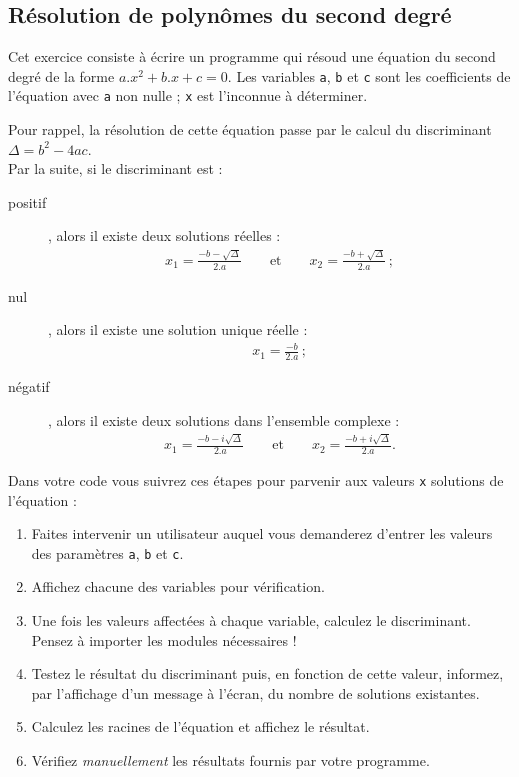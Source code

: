 

\subsection{Résolution de polynômes du second degré}

Cet exercice  consiste à écrire un programme qui résoud une  équation du second degré  de la
forme  $a.x^2+b.x+c =  0$.   Les variables  \texttt{a}, \texttt{b}  et
\texttt{c}  sont  les  coefficients   de  l'équation  avec  \texttt{a}
non nulle ; \texttt{x} est l'inconnue à déterminer.

Pour rappel,  la résolution de cette  équation passe par le  calcul du
discriminant $\Delta =  b^2-4ac$.\\ Par la suite, si  le 
discriminant est :

\begin{description}
\item[positif], alors il existe deux solutions réelles :
\begin{eqnarray*}
  x_1   =  \frac{-b-\sqrt{\Delta}}{2.a}   \qquad  \textrm{et}   \qquad
  x_2=\frac{-b+\sqrt{\Delta}}{2.a}\,;
\end{eqnarray*}
\item[nul], alors il existe une solution unique réelle :
\begin{eqnarray*}
  x_1 = \frac{-b}{2.a}\,;
\end{eqnarray*}
\item[négatif], alors il existe deux solutions dans l'ensemble complexe :
\begin{eqnarray*}
  x_1  =   \frac{-b-i\sqrt{\Delta}}{2.a}  \qquad   \textrm{et}  \qquad
  x_2=\frac{-b+i\sqrt{\Delta}}{2.a}.
\end{eqnarray*}
\end{description}


Dans votre code vous suivrez ces étapes pour parvenir aux valeurs \texttt{x} solutions de l'équation :
\begin{enumerate}

\item Faites intervenir un utilisateur auquel vous demanderez d'entrer
  les valeurs des paramètres \texttt{a}, \texttt{b} et \texttt{c}.
\item Affichez chacune des variables pour vérification.
\item  Une fois  les  valeurs affectées à chaque variable, calculez  le
  discriminant.\\ Pensez à importer les modules nécessaires !
\item  Testez le  résultat du  discriminant  puis, en  fonction de  cette
  valeur, informez, par l'affichage d'un  message à l'écran, du nombre
  de solutions existantes.
\item Calculez  les racines de l'équation et affichez  le résultat.
\item Vérifiez \emph{manuellement} les résultats fournis par votre programme.

\end{enumerate}
